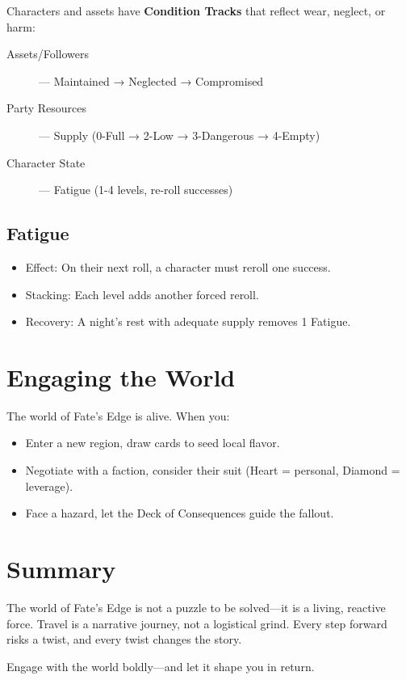 Characters and assets have \textbf{Condition Tracks} that reflect wear, neglect, or harm:

\begin{description}
  \item[Assets/Followers] — Maintained → Neglected → Compromised
  \item[Party Resources] — Supply (0-Full → 2-Low → 3-Dangerous → 4-Empty)
  \item[Character State] — Fatigue (1-4 levels, re-roll successes)
\end{description}

\subsection*{Fatigue}
\begin{itemize}
    \item Effect: On their next roll, a character must reroll one success.
    \item Stacking: Each level adds another forced reroll.
    \item Recovery: A night's rest with adequate supply removes 1 Fatigue.
\end{itemize}

\section{Engaging the World}

The world of Fate's Edge is alive. When you:

\begin{itemize}
  \item Enter a new region, draw cards to seed local flavor.
  \item Negotiate with a faction, consider their suit (Heart = personal, Diamond = leverage).
  \item Face a hazard, let the Deck of Consequences guide the fallout.
\end{itemize}

\section{Summary}

The world of Fate's Edge is not a puzzle to be solved—it is a living, reactive force. Travel is a narrative journey, not a logistical grind. Every step forward risks a twist, and every twist changes the story.

Engage with the world boldly—and let it shape you in return.
